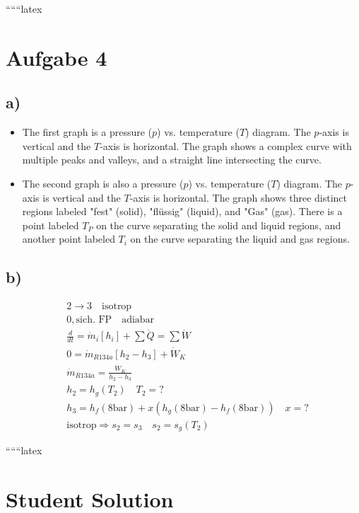 
``````latex


\section*{Aufgabe 4}

\subsection*{a)}

\begin{itemize}
    \item The first graph is a pressure ($p$) vs. temperature ($T$) diagram. The $p$-axis is vertical and the $T$-axis is horizontal. The graph shows a complex curve with multiple peaks and valleys, and a straight line intersecting the curve.
    \item The second graph is also a pressure ($p$) vs. temperature ($T$) diagram. The $p$-axis is vertical and the $T$-axis is horizontal. The graph shows three distinct regions labeled "fest" (solid), "flüssig" (liquid), and "Gas" (gas). There is a point labeled $T_P$ on the curve separating the solid and liquid regions, and another point labeled $T_i$ on the curve separating the liquid and gas regions.
\end{itemize}

\subsection*{b)}

\begin{align*}
    &2 \rightarrow 3 \quad \text{isotrop} \\
    &0, \text{sich. FP} \quad \text{adiabar} \\
    &\frac{d}{dt} = \dot{m}_i [h_i] + \sum \dot{Q} = \sum \dot{W} \\
    &0 = \dot{m}_{R134a} [h_2 - h_3] + \dot{W}_K \\
    &\dot{m}_{R134a} = \frac{\dot{W}_K}{h_2 - h_3} \\
    &h_2 = h_g(T_2) \quad T_2 = ? \\
    &h_3 = h_f(8 \text{bar}) + x (h_g(8 \text{bar}) - h_f(8 \text{bar})) \quad x = ? \\
    &\text{isotrop} \Rightarrow s_2 = s_3 \quad s_2 = s_g(T_2)
\end{align*}

``````latex


\section*{Student Solution}

